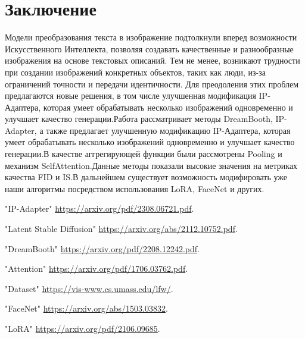 \documentclass{article}
\begin{document}
\section{Заключение}
Модели преобразования текста в изображение подтолкнули вперед возможности Искусственного Интеллекта, позволяя создавать качественные и разнообразные изображения на основе текстовых описаний. Тем не менее, возникают трудности при создании изображений конкретных объектов, таких как люди, из-за ограничений точности и передачи идентичности. Для преодоления этих проблем предлагаются новые решения, в том числе улучшенная модификация IP-Адаптера, которая умеет обрабатывать несколько изображений одновременно и улучшает качество генерации.Работа рассматривает методы DreamBooth, IP-Adapter, а также предлагает улучшенную модификацию IP-Адаптера, которая умеет обрабатывать несколько изображений одновременно и улучшает качество генерации.В качестве аггрегирующей функции были рассмотрены Pooling и механизм SelfAttention.Данные методы показали высокие значения на метриках качества FID и IS.В дальнейшем существует возможность модифировать уже наши алгоритмы посредством использования LoRA\cite{7}, FaceNet\cite{6}  и других.

\begin{thebibliography}{1}
"IP-Adapter" 
\url{https://arxiv.org/pdf/2308.06721.pdf}.

"Latent Stable Diffusion" 
\url{https://arxiv.org/abs/2112.10752.pdf}.

"DreamBooth" 
\url{https://arxiv.org/pdf/2208.12242.pdf}.

"Attention" 
\url{https://arxiv.org/pdf/1706.03762.pdf}.

"Dataset" 
\url{https://vis-www.cs.umass.edu/lfw/}.

"FaceNet" 
\url{https://arxiv.org/abs/1503.03832}.

"LoRA" 
\url{https://arxiv.org/pdf/2106.09685}.

\end{thebibliography}
\end{document}
